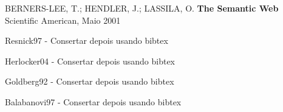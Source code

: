 \begin{thebibliography}{99}

 


    BERNERS-LEE, T.; HENDLER, J.; LASSILA, O.
    \textbf{The Semantic Web}
    Scientific American, Maio 2001

 Resnick97 - Consertar depois usando bibtex

 Herlocker04 - Consertar depois usando bibtex



 Goldberg92 - Consertar depois usando bibtex


 Balabanovi97 - Consertar depois usando bibtex


\end{thebibliography}
